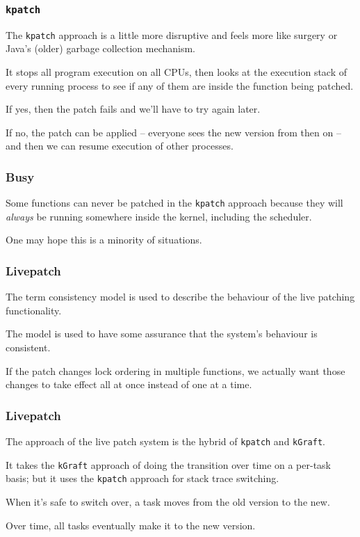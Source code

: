 \begin{frame}
\frametitle{\texttt{kpatch}}

The \texttt{kpatch} approach is a little more disruptive and feels more like surgery or Java's (older) garbage collection mechanism.

It stops all program execution on all CPUs, then looks at the execution stack of every running process to see if any of them are inside the function being patched. 

If yes, then the patch fails and we'll have to try again later.

If no, the patch can be applied -- everyone sees the new version from then on -- and then we can resume execution of other processes.

\end{frame}


\begin{frame}
\frametitle{Busy}

Some functions can never be patched in the \texttt{kpatch} approach because they will \textit{always} be running somewhere inside the kernel, including the scheduler. 


One may hope this is a minority of situations.

\end{frame}


\begin{frame}
\frametitle{Livepatch}

The term \alert{consistency model} is used to describe the behaviour of the live patching functionality. 

The model is used to have some assurance that the system's behaviour is consistent. 

If the patch changes lock ordering in multiple functions, we actually want those changes to take effect all at once instead of one at a time. 

\end{frame}


\begin{frame}
\frametitle{Livepatch}

The approach of the live patch system is the hybrid of \texttt{kpatch} and \texttt{kGraft}. 

It takes the \texttt{kGraft} approach of doing the transition over time on a per-task basis; but it uses the \texttt{kpatch} approach for stack trace switching. 

When it's safe to switch over, a task moves from the old version to the new. 

Over time, all tasks eventually make it to the new version. 

\end{frame}


